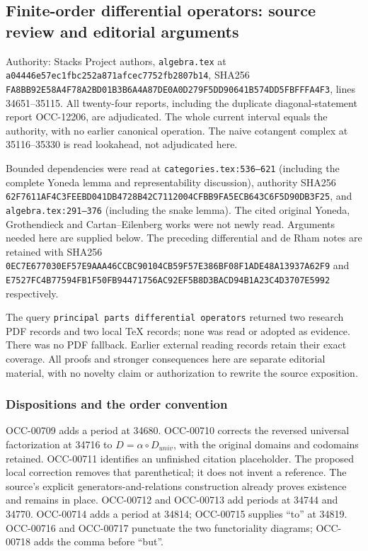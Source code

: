 \subsection{Finite-order differential operators: source review and editorial arguments}\label{algebra-proof-043-finite-order-differential-operators-source-review-and-editorial-arguments}

Authority: Stacks Project authors, \texttt{algebra.tex} at \texttt{a04446e57ec1fbc252a871afcec7752fb2807b14}, SHA256 \texttt{FA8BB92E58A4F78A2BD01B3B6A4A87DE0A0D279F5DD90641B574DD5FBFFFA4F3}, lines 34651--35115. All twenty-four reports, including the duplicate diagonal-statement report OCC-12206, are adjudicated. The whole current interval equals the authority, with no earlier canonical operation. The naive cotangent complex at 35116--35330 is read lookahead, not adjudicated here.

Bounded dependencies were read at \texttt{categories.tex:536–621} (including the complete Yoneda lemma and representability discussion), authority SHA256 \texttt{62F7611AF4C3FEEBD041DB4728B42C7112004CFBB9FA5ECB643C6F5D90DB3F25}, and \texttt{algebra.tex:291–376} (including the snake lemma). The cited original Yoneda, Grothendieck and Cartan--Eilenberg works were not newly read. Arguments needed here are supplied below. The preceding differential and de Rham notes are retained with SHA256 \texttt{0EC7E677030EF57E9AAA46CCBC90104CB59F57E386BF08F1ADE48A13937A62F9} and \texttt{E7527FC4B77594FB1F50FB94471756AC92EF5B8D3BACD94B1A23C4D3707E5992} respectively.

The query \texttt{principal\ parts\ differential\ operators} returned two research PDF records and two local TeX records; none was read or adopted as evidence. There was no PDF fallback. Earlier external reading records retain their exact coverage. All proofs and stronger consequences here are separate editorial material, with no novelty claim or authorization to rewrite the source exposition.

\subsubsection{Dispositions and the order convention}\label{algebra-proof-043-dispositions-and-the-order-convention}

OCC-00709 adds a period at 34680. OCC-00710 corrects the reversed universal factorization at 34716 to \(D=\alpha\circ D_{univ}\), with the original domains and codomains retained. OCC-00711 identifies an unfinished citation placeholder. The proposed local correction removes that parenthetical; it does not invent a reference. The source's explicit generators-and-relations construction already proves existence and remains in place. OCC-00712 and OCC-00713 add periods at 34744 and 34770. OCC-00714 adds a period at 34814; OCC-00715 supplies ``to'' at 34819. OCC-00716 and OCC-00717 punctuate the two functoriality diagrams; OCC-00718 adds the comma before ``but''.

